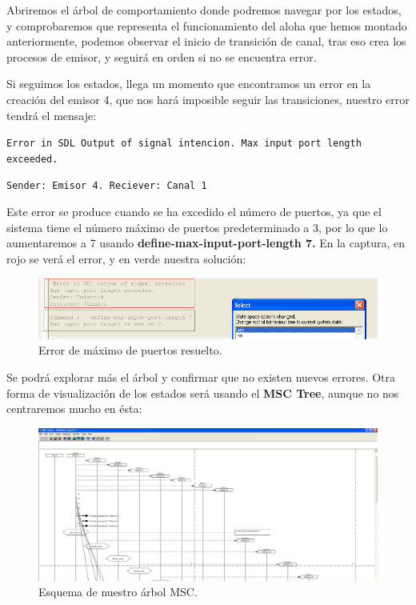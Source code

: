 \documentclass{article}
\begin{document}
Abriremos el árbol de comportamiento donde podremos navegar por los estados, y comprobaremos que representa el funcionamiento del aloha que hemos montado anteriormente, podemos observar el inicio de transición de canal, tras eso crea los procesos de emisor, y seguirá en orden si no se encuentra error. 

Si seguimos los estados, llega un momento que encontramos un error en la creación del emisor 4, que nos hará imposible seguir las transiciones, nuestro error tendrá el mensaje:

\quad

\verb|Error in SDL Output of signal intencion. Max input port length exceeded. |

\verb|Sender: Emisor 4. Reciever: Canal 1|

\quad

Este error se produce cuando se ha excedido el número de puertos, ya que el sistema tiene el número máximo de puertos predeterminado a 3, por lo que lo aumentaremos a 7 usando \textbf{define-max-input-port-length 7.} En la captura, en rojo se verá el error, y en verde nuestra solución:

\quad

\begin{figure}[h]
    \centering
    \includegraphics[width=0.95\linewidth]{src/error resuelto.png}
    \caption{\label{fig:errorresuelto} Error de máximo de puertos resuelto.}
\end{figure}

Se podrá explorar más el árbol y confirmar que no existen nuevos errores. Otra forma de visualización de los estados será usando el \textbf{MSC Tree}, aunque no nos centraremos mucho en ésta:

\quad 

\begin{figure}[h]
    \centering
    \includegraphics[width=0.65\linewidth]{src/MSC tree.png}
    \caption{\label{fig:msctree} Esquema de nuestro árbol MSC.}
\end{figure}
\end{document}
